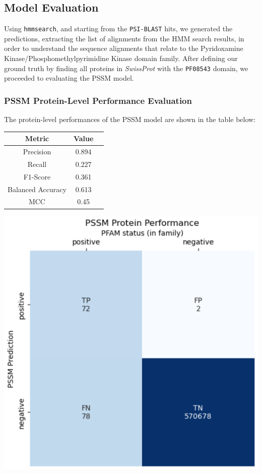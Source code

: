 \documentclass[10pt,twocolumn,letterpaper]{article}
\begin{document}
\subsection{Model Evaluation}

Using \texttt{hmmsearch}, and starting from the \texttt{PSI-BLAST} hits, we generated the predictions, extracting the list of alignments from the HMM search results, in order to understand the sequence alignments that relate to the Pyridoxamine Kinase/Phosphomethylpyrimidine Kinase domain family.
After defining our ground truth by finding all proteins in \textit{SwissProt} with the \texttt{PF08543} domain, we proceeded to evaluating the PSSM model.



\subsubsection{PSSM Protein-Level Performance Evaluation}

The protein-level performances of the PSSM model are shown in the table below:

\begin{center}
    \begin{tabular}{ccc}
        \toprule
        Metric & Value \\
        \midrule
        Precision & 0.894 \\
        Recall & 0.227 \\
        F1-Score & 0.361 \\
        Balanced Accuracy & 0.613 \\
        MCC & 0.45 \\
        \bottomrule
    \end{tabular}
\end{center} 

\begin{center}
    \includegraphics[scale=0.45]{report/img/pssm_prot_performance.png}
\end{center}
\end{document}
